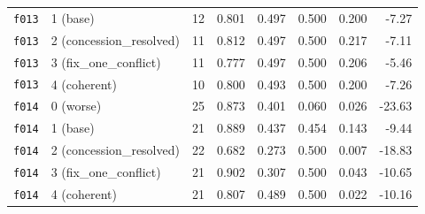 \documentclass[11pt]{article}
\begin{document}
\begin{table}[htbp]
\begin{tabular}{llrrrrrr}
\texttt{f013} & 1 (base) & 12 & 0.801 & 0.497 & 0.500 & 0.200 & -7.27 \\
\texttt{f013} & 2 (concession\_resolved) & 11 & 0.812 & 0.497 & 0.500 & 0.217 & -7.11 \\
\texttt{f013} & 3 (fix\_one\_conflict) & 11 & 0.777 & 0.497 & 0.500 & 0.206 & -5.46 \\
\texttt{f013} & 4 (coherent) & 10 & 0.800 & 0.493 & 0.500 & 0.200 & -7.26 \\
\midrule
\texttt{f014} & 0 (worse) & 25 & 0.873 & 0.401 & 0.060 & 0.026 & -23.63 \\
\texttt{f014} & 1 (base) & 21 & 0.889 & 0.437 & 0.454 & 0.143 & -9.44 \\
\texttt{f014} & 2 (concession\_resolved) & 22 & 0.682 & 0.273 & 0.500 & 0.007 & -18.83 \\
\texttt{f014} & 3 (fix\_one\_conflict) & 21 & 0.902 & 0.307 & 0.500 & 0.043 & -10.65 \\
\texttt{f014} & 4 (coherent) & 21 & 0.807 & 0.489 & 0.500 & 0.022 & -10.16 \\
\bottomrule
\end{tabular}
\end{table}
\end{document}
